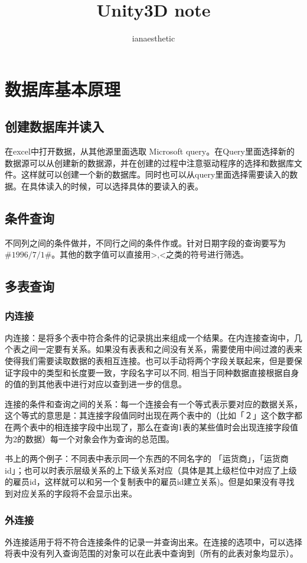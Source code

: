 \documentclass[10pt, a4paper]{article}
\author{ianaesthetic}
\title{Unity3D note}
\begin{document}
    \section{数据库基本原理}
        \subsection{创建数据库并读入}
            在excel中打开数据，从其他源里面选取 Microsoft query。在Query里面选择新的数据源可以从创建新的数据源，并在创建的过程中注意驱动程序的选择和数据库文件。这样就可以创建一个新的数据库。同时也可以从query里面选择需要读入的数据。在具体读入的时候，可以选择具体的要读入的表。 
        \subsection{条件查询}
            不同列之间的条件做并，不同行之间的条件作或。针对日期字段的查询要写为 $\#1996/7/1\#$。其他的数字值可以直接用>,<之类的符号进行筛选。

        \subsection{多表查询}
            \subsubsection{内连接}
                内连接：是将多个表中符合条件的记录挑出来组成一个结果。在内连接查询中，几个表之间一定要有关系。如果没有表表和之间没有关系，需要使用中间过渡的表来使得我们需要读取数据的表相互连接。也可以手动将两个字段关联起来，但是要保证字段中的类型和长度要一致，字段名字可以不同, 相当于同种数据直接根据自身的值的到其他表中进行对应以查到进一步的信息。

                连接的条件和查询之间的关系：每一个连接会有一个等式表示要对应的数据关系，这个等式的意思是：其连接字段值同时出现在两个表中的（比如「２」这个数字都在两个表中的相连接字段中出现了，那么在查询1表的某些值时会出现连接字段值为2的数据）每一个对象会作为查询的总范围。
            
                书上的两个例子：不同表中表示同一个东西的不同名字的 「运货商」，「运货商id」；也可以时表示层级关系的上下级关系对应（具体是其上级栏位中对应了上级的雇员id，这样就可以和另一个复制表中的雇员id建立关系)。但是如果没有寻找到对应关系的字段将不会显示出来。
            \subsubsection{外连接}
                外连接适用于将不符合连接条件的记录一并查询出来。在连接的选项中，可以选择将表中没有列入查询范围的对象可以在此表中查询到（所有的此表对象均显示）。
\end{document}
